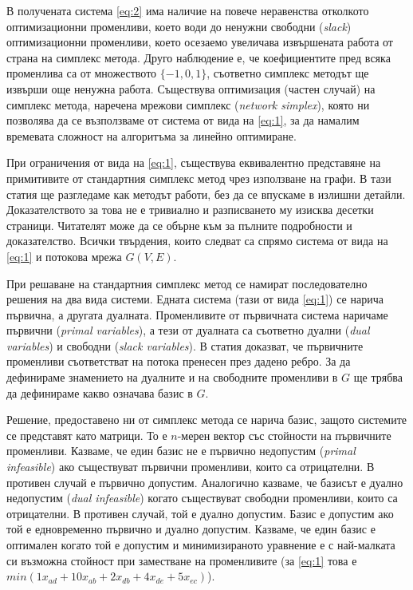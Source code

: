 \documentclass[a4paper,12pt]{article}
\begin{document}
\bigbreak

В получената система \ref{eq:2} има наличие на повече неравенства отколкото оптимизационни променливи, което води до ненужни свободни (\textit{slack}) оптимизационни променливи, което осезаемо увеличава извършената работа от страна на симплекс метода. Друго наблюдение е, че коефициентите пред всяка променлива са от множеството $\{-1, 0, 1\}$, съответно симплекс методът ще извърши още ненужна работа. Съществува оптимизация (частен случай) на симплекс метода, наречена мрежови симплекс (\textit{network simplex}), която ни позволява да се възползваме от система от вида на \ref{eq:1}, за да намалим времевата сложност на алгоритъма за линейно оптимиране.

\bigbreak

При ограничения от вида на \ref{eq:1}, съществува еквивалентно представяне на примитивите от стандартния симплекс метод чрез използване на графи. В тази статия ще разгледаме как методът работи, без да се впускаме в излишни детайли. Доказателството за това не е тривиално и разписването му изисква десетки страници. Читателят може да се обърне към \cite{networksimplexmethod} за пълните подробности и доказателство. Всички твърдения, които следват са спрямо система от вида на \ref{eq:1} и потокова мрежа $G(V, E)$.

\bigbreak

При решаване на стандартния симплекс метод се намират последователно решения на два вида системи. Едната система (тази от вида \ref{eq:1}) се нарича първична, а другата дуалната. Променливите от първичната система наричаме първични (\textit{primal variables}), а тези от дуалната са съответно дуални (\textit{dual variables}) и свободни (\textit{slack variables}). В статия \cite{networksimplexmethod} доказват, че първичните променливи съответстват на потока пренесен през дадено ребро. За да дефинираме знамението на дуалните и на свободните променливи в $G$ ще трябва да дефинираме какво означава базис в $G$.

\bigbreak

Решение, предоставено ни от симплекс метода се нарича базис, защото системите се представят като матрици. То е $n$-мерен вектор със стойности на първичните променливи. Казваме, че един базис не е първично недопустим (\textit{primal infeasible}) ако съществуват първични променливи, които са отрицателни. В противен случай е първично допустим. Аналогично казваме, че базисът е дуално недопустим (\textit{dual infeasible}) когато съществуват свободни променливи, които са отрицателни. В противен случай, той е дуално допустим. Базис е допустим ако той е едновременно първично и дуално допустим. Казваме, че един базис е оптимален когато той е допустим и минимизираното уравнение е с най-малката си възможна стойност при заместване на променливите (за \ref{eq:1} това е $min(1 x_{ad} + 10 x_{ab} + 2 x_{db} + 4 x_{de} + 5 x_{ec})$).
\end{document}
